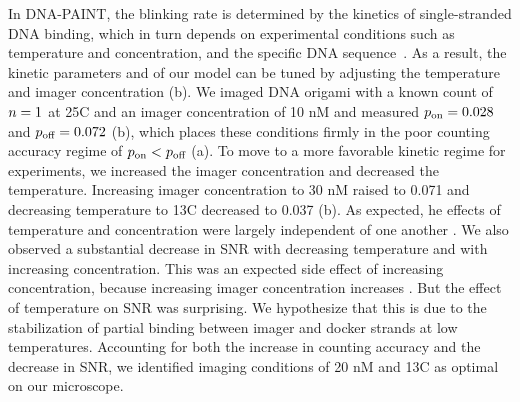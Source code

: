 In DNA-PAINT, the blinking rate is determined by the kinetics of single-stranded DNA binding,
which in turn depends on experimental conditions such as temperature and concentration, 
and the specific DNA sequence~\citep{jungmann_single-molecule_2010}.
	As a result, the kinetic parameters \pon and \poff of our model can be 
	tuned by adjusting the temperature and imager concentration (b).
	We imaged DNA origami with a known count of $n=1$ at 25\textdegree C and an 
	imager concentration of 10 nM and measured $p_\text{on}=0.028$ and $p_\text{off}=0.072$ 
	(b),
	which places these conditions firmly in the poor counting 
	accuracy regime of $p_\text{on} < p_\text{off}$ (a). %
	To move to a more favorable kinetic regime for experiments, 
	we increased the imager concentration and decreased the temperature.
	Increasing imager concentration to 30 nM raised \pon to 0.071 and 
	decreasing temperature to 13\textdegree C decreased \poff to 0.037 
	(b).
	As expected, he effects of temperature and concentration were largely independent 
	of one another \cite{jungmann_single-molecule_2010}.
	We also observed a substantial decrease in SNR with decreasing temperature 
	and with increasing concentration. 
	This was an expected side effect of increasing concentration, because increasing 
	imager concentration increases \rb.
	But the effect of temperature on SNR was surprising. 
	We hypothesize that this is due to the stabilization of partial 
	binding between imager and docker strands at low temperatures.
	Accounting for both the increase in counting accuracy and the decrease 
	in SNR, we identified imaging conditions of 20 nM and 13\textdegree C as 
	optimal on our microscope.

